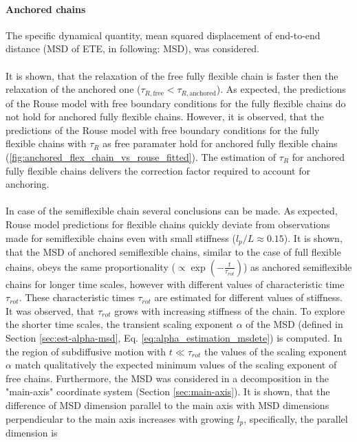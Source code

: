\documentclass[
    paper=A4,pagesize=automedia,fontsize=12pt,
    BCOR=15mm,DIV=22,
    twoside,headinclude,footinclude=false,
    fleqn,             %
    bibliography=totocnumbered,          %
    listof=totoc,                %
    listof=flat,                 %
    cleardoublepage=empty      %
    numbers=endperiod
]{scrartcl}
\begin{document}
\paragraph{Anchored chains}
The specific dynamical quantity, mean squared displacement 
of end-to-end distance (MSD of ETE, in following: MSD), was considered.
\\
\\
It is shown,
that the relaxation of the free fully flexible chain is faster then the relaxation of the
anchored one ($\tau_{R,\text{free}} < \tau_{R,\text{anchored}}$). 
As expected, the predictions of the Rouse model with free boundary conditions 
for the fully flexible chains do not hold for anchored fully flexible chains.
However, it is observed, that the predictions of the Rouse model with free boundary conditions 
for the fully flexible chains with $\tau_R$ as free paramater hold for anchored fully flexible
chains (\autoref{fig:anchored_flex_chain_vs_rouse_fitted}). The estimation of $\tau_R$ for anchored fully flexible chains 
delivers the correction factor required to account for anchoring.
\\
\\
In case of the semiflexible chain several conclusions can be made. As expected,
Rouse model predictions for flexible chains quickly deviate from observations made 
for semiflexible chains even with small stiffness ($l_p/L \approx 0.15$).
It is shown, that the MSD of anchored semiflexible chains, 
similar to the case of full flexible chains, obeys the same 
proportionality ($\propto \exp\left(-\frac{t}{\tau_{rot}}\right)$) 
as anchored semiflexible chains for longer time scales, however with
different values of characteristic time $\tau_{rot}$. These characteristic times 
$\tau_{rot}$ are estimated for different values of stiffness. It was observed, that 
$\tau_{rot}$ grows with increasing stiffness of the chain. 
To explore the shorter time
scales, the transient scaling exponent $\alpha$ of the MSD (defined in 
Section \ref{sec:est-alpha-msd}, Eq. \ref{eq:alpha_estimation_msdete}) is computed.
In the region of subdiffusive 
motion with $t\ll\tau_{rot}$ the values of the scaling exponent $\alpha$ match
qualitatively the expected minimum values of the scaling exponent of free chains.
Furthermore, the MSD was considered in a decomposition in the "main-axis" coordinate 
system (Section \ref{sec:main-axis}). It is shown, that the difference of MSD dimension parallel
to the main axis with MSD dimensions perpendicular to the main axis 
increases with growing $l_p$, specifically, the parallel dimension is 
\end{document}
